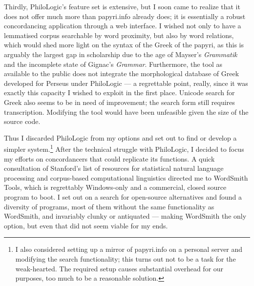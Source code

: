 Thirdly, PhiloLogic's feature set is extensive, but I soon came to realize that it
does not offer much more than papyri.info already does; it is essentially a
robust concordancing application through a web interface. I wished not only to
have a lemmatised corpus searchable by word proximity, but also by word
relations, which would shed more light on the syntax of the Greek of the
papyri, as this is arguably the largest gap in scholarship due to the age of
Mayser's \emph{Grammatik} and the incomplete state of Gignac's \emph{Grammar}.
Furthermore, the tool as available to the public does not integrate the
morphological database of Greek developed for Perseus under PhiloLogic --- a
regrettable point, really, since it was exactly this capacity I wished to
exploit in the first place. Unicode search for Greek also seems to be in need
of improvement; the search form still requires transcription. Modifying the
tool would have been unfeasible given the size of the source code.

Thus I discarded PhiloLogic from my options and set out to find or develop a
simpler system.\footnote{I also considered setting up a mirror of papyri.info
on a personal server and modifying the search functionality; this turns out not
to be a task for the weak-hearted. The required setup causes substantial
overhead for our purposes, too much to be a reasonable solution.} After the
technical struggle with PhiloLogic, I decided to focus my efforts on
concordancers that could replicate its functions. A quick consultation of
Stanford's list of resources \citep{stanfordnlpres} for statistical natural
language processing and corpus-based computational linguistics directed me to
WordSmith Tools, which is regrettably Windows-only and a commercial, closed
source program to boot.  I set out on a search for open-source alternatives and
found a diversity of programs, most of them without the same functionality as
WordSmith, and invariably clunky or antiquated --- making WordSmith the only
option, but even that did not seem viable for my ends.

